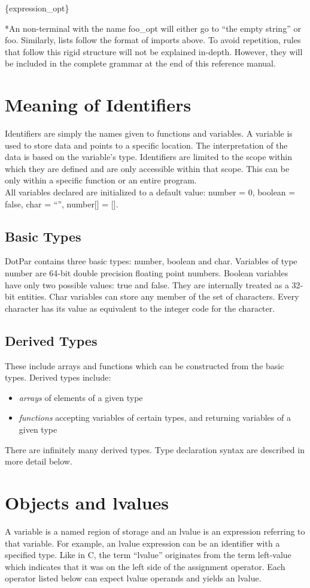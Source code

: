 \centerline{\{expression\_opt\}}

*An non-terminal with the name foo\_opt will either go to ``the empty string'' or foo. Similarly, lists follow the format of imports above. To avoid repetition, rules that follow this rigid structure will not be explained in-depth. However, they will be included in the complete grammar at the end of this reference manual.
\section{Meaning of Identifiers}
Identifiers are simply the names given to functions and variables. A variable is used to store data and points to a specific location. The interpretation of the data is based on the variable's type. Identifiers are limited to the scope within which they are defined and are only accessible within that scope. This can be only within a specific function or an entire program.
\\All variables declared are initialized to a default value: number = 0, boolean = false, char = ``'', number[] = [].
\subsection{Basic Types}
DotPar contains three basic types: number, boolean and char. Variables of type number are 64-bit double precision floating point numbers. Boolean variables have only two possible values: true and false. They are internally treated as a 32-bit entities. Char variables can store any member of the set of characters. Every character has its value as equivalent to the integer code for the character.
\subsection{Derived Types}
These include arrays and functions which can be constructed from the basic types. Derived types include:
\begin{itemize}
\item
\emph{arrays} of elements of a given type
\item
\emph{functions} accepting variables of certain types, and returning variables of a given type
\end{itemize}
There are infinitely many derived types. Type declaration syntax are described in more detail below.

\section{Objects and lvalues}
A variable is a named region of storage and an lvalue is an expression referring to that variable. For example, an lvalue expression can be an identifier with a specified type. Like in C, the term ``lvalue'' originates from the term left-value which indicates that it was on the left side of the assignment operator. Each operator listed below can expect lvalue operands and yields an lvalue.

